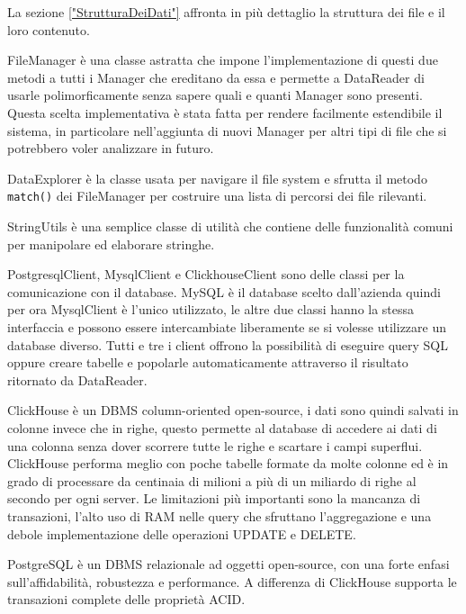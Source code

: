La sezione \ref{"StrutturaDeiDati"} affronta in più dettaglio la struttura dei file e il loro contenuto.

FileManager è una classe astratta che impone l'implementazione di questi due metodi a tutti i Manager che ereditano da essa e permette a DataReader di usarle polimorficamente senza sapere quali e quanti Manager sono presenti. Questa scelta implementativa è stata fatta per rendere facilmente estendibile il sistema, in particolare nell'aggiunta di nuovi Manager per altri tipi di file che si potrebbero voler analizzare in futuro.

DataExplorer è la classe usata per navigare il file system e sfrutta il metodo \texttt{match()} dei FileManager per costruire una lista di percorsi dei file rilevanti.

StringUtils è una semplice classe di utilità che contiene delle funzionalità comuni per manipolare ed elaborare stringhe.

PostgresqlClient, MysqlClient e ClickhouseClient sono delle classi per la comunicazione con il database. MySQL\cite{mysql} è il database scelto dall'azienda quindi per ora MysqlClient è l'unico utilizzato, le altre due classi hanno la stessa interfaccia e possono essere intercambiate liberamente se si volesse utilizzare un database diverso.
Tutti e tre i client offrono la possibilità di eseguire query SQL oppure creare tabelle e popolarle automaticamente attraverso il risultato ritornato da DataReader.

ClickHouse è un DBMS column-oriented open-source, i dati sono quindi salvati in colonne invece che in righe, questo permette al database di accedere ai dati di una colonna senza dover scorrere tutte le righe e scartare i campi superflui. ClickHouse\cite{clickhouse} performa meglio con poche tabelle formate da molte colonne ed è in grado di processare da centinaia di milioni a più di un miliardo di righe al secondo per ogni server. Le limitazioni più importanti sono la mancanza di transazioni, l'alto uso di RAM nelle query che sfruttano l'aggregazione e una debole implementazione delle operazioni UPDATE e DELETE.

PostgreSQL\cite{postgresql} è un DBMS relazionale ad oggetti open-source, con una forte enfasi sull'affidabilità, robustezza e performance. A differenza di ClickHouse supporta le transazioni complete delle proprietà ACID.

